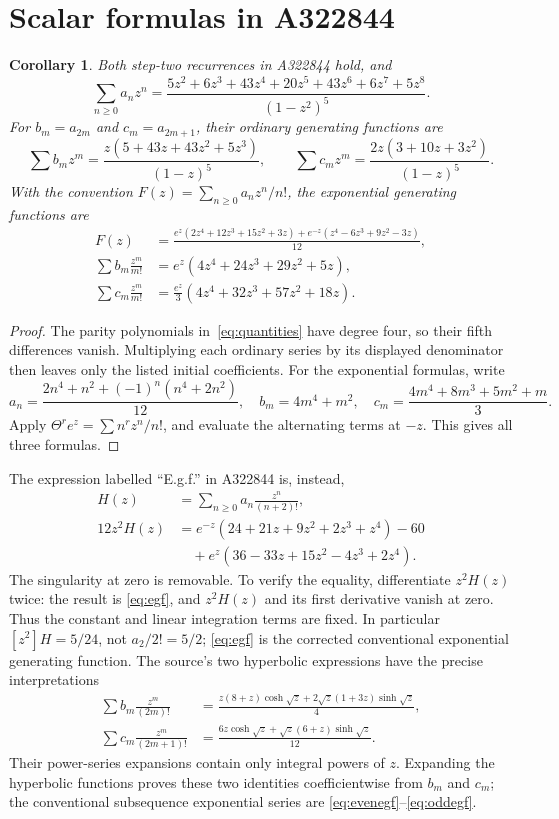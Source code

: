 \documentclass[11pt]{article}
\newtheorem{corollary}[theorem]{Corollary}
\begin{document}
\section{Scalar formulas in A322844}
\begin{corollary}\label{cor:generating}
Both step-two recurrences in A322844 hold, and
\[
\sum_{n\geq0}a_nz^n=
\frac{5z^2+6z^3+43z^4+20z^5+43z^6+6z^7+5z^8}{(1-z^2)^5}.
\]
For $b_m=a_{2m}$ and $c_m=a_{2m+1}$, their ordinary generating functions are
\[
\sum b_mz^m=\frac{z(5+43z+43z^2+5z^3)}{(1-z)^5},\qquad
\sum c_mz^m=\frac{2z(3+10z+3z^2)}{(1-z)^5}.
\]
With the convention $F(z)=\sum_{n\geq0}a_nz^n/n!$, the exponential
generating functions are
\begin{align}
F(z)&=\frac{e^z(2z^4+12z^3+15z^2+3z)
+e^{-z}(z^4-6z^3+9z^2-3z)}{12},\label{eq:egf}\\
\sum b_m\frac{z^m}{m!}&=e^z(4z^4+24z^3+29z^2+5z),\label{eq:evenegf}\\
\sum c_m\frac{z^m}{m!}&=\frac{e^z}{3}(4z^4+32z^3+57z^2+18z).
\label{eq:oddegf}
\end{align}
\end{corollary}
\begin{proof}
The parity polynomials in~\eqref{eq:quantities} have degree four,
so their fifth differences vanish. Multiplying each ordinary series by
its displayed denominator then leaves only the listed initial coefficients.
For the exponential formulas, write
\[
a_n=\frac{2n^4+n^2+(-1)^n(n^4+2n^2)}{12},\quad
b_m=4m^4+m^2,\quad
c_m=\frac{4m^4+8m^3+5m^2+m}{3}.
\]
Apply $\Theta^r e^z=\sum n^r z^n/n!$, and evaluate the alternating
terms at $-z$. This gives all three formulas.
\end{proof}

The expression labelled ``E.g.f.'' in A322844 is, instead,
\begin{equation}\label{eq:shifted}
\begin{aligned}
H(z)&=\sum_{n\geq0}a_n\frac{z^n}{(n+2)!},\\
12z^2H(z)&=e^{-z}(24+21z+9z^2+2z^3+z^4)-60\\
&\quad+e^z(36-33z+15z^2-4z^3+2z^4).
\end{aligned}
\end{equation}
The singularity at zero is removable. To verify the equality, differentiate
$z^2H(z)$ twice: the result is \eqref{eq:egf}, and $z^2H(z)$ and its
first derivative vanish at zero. Thus the constant and linear integration
terms are fixed. In particular $[z^2]H=5/24$, not $a_2/2!=5/2$;
\eqref{eq:egf} is the corrected conventional exponential generating function.
The source's two hyperbolic expressions have the precise interpretations
\begin{align*}
\sum b_m\frac{z^m}{(2m)!}
&=\frac{z(8+z)\cosh\sqrt z+2\sqrt z(1+3z)\sinh\sqrt z}{4},\\
\sum c_m\frac{z^m}{(2m+1)!}
&=\frac{6z\cosh\sqrt z+\sqrt z(6+z)\sinh\sqrt z}{12}.
\end{align*}
Their power-series expansions contain only integral powers of $z$.
Expanding the hyperbolic functions proves these two identities
coefficientwise from $b_m$ and $c_m$; the conventional
subsequence exponential series are \eqref{eq:evenegf}--\eqref{eq:oddegf}.
\end{document}

